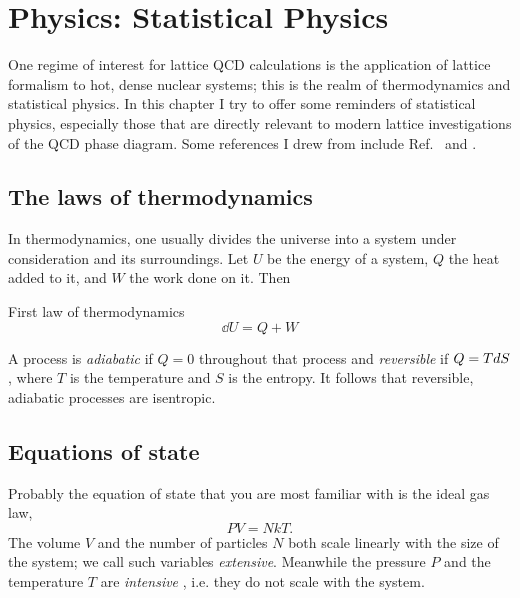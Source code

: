 \chapter{Physics: Statistical Physics}

One regime of interest for lattice QCD calculations is the application
of lattice formalism to hot, dense nuclear systems; this is the realm
of thermodynamics and statistical physics. In this chapter I try to
offer some reminders of statistical physics, especially those that
are directly relevant to modern lattice investigations of the QCD
phase diagram. Some references I drew from include
Ref.~\cite{tahir-kheli_general_2012} and \cite{kardar_statistical_2007}.

\section{The laws of thermodynamics}

In thermodynamics, one usually divides the universe into a system under
consideration and its surroundings. Let $U$ be the energy of a system,
$Q$ the heat added to it, and
$W$ the work done on it. Then
\begin{theorem}{First law of thermodynamics}{}
  $$\dd U=Q+W$$
\end{theorem}

A process is {\it adiabatic} if $Q=0$ throughout that process
and {\it reversible} if $Q=T\\dS$, where $T$ is the
temperature and $S$ is the entropy. It follows that reversible,
adiabatic processes are isentropic. 


\section{Equations of state}\label{sec:EoS}


Probably the equation of state that you are most familiar with is the 
ideal gas law,
\begin{equation}
  PV=NkT.
\end{equation}
The volume $V$ and the number of particles $N$ both scale linearly with the
size of the system; we call such variables {\it extensive}. 
Meanwhile the pressure $P$ and the temperature $T$ are {\it intensive}
, i.e. they do not scale with the system.

